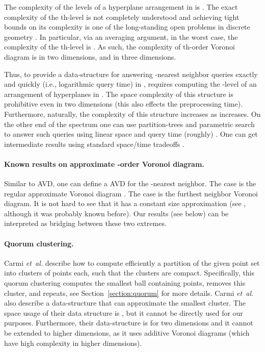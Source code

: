 \documentclass[12pt]{article}
\makeatletter
\newcommand{\Term}[1]{\textsf{#1}}
\newcommand{\TermI}[1]{\Term{#1}\index{#1@\Term{#1}}}
\theoremstyle{remark}{\theorembodyfont{\rm} \newtheorem{remark}[theorem]{Remark}}
\newcommand{\secref}[1]{Section~\ref{section:#1}}
\newcommand{\AVD}{\TermI{AVD}\xspace}
\newcommand{\etal}{\textit{et~al.}\xspace}
\renewcommand{\th}{th\xspace}
\makeatother
\begin{document}
The complexity of the  levels of a hyperplane arrangement in
 is  \cite{cs-arscg-89}. The exact complexity of the \th-level is not
completely understood and achieving tight bounds on its complexity is
one of the long-standing open problems in discrete geometry
\cite{m-ldg-02}. In particular, via an averaging argument, in the
worst case, the complexity of the \th-level is . As such, the
complexity of \th-order Voronoi diagram is  in two
dimensions, and  in three dimensions.

Thus, to provide a data-structure for answering -nearest neighbor
queries exactly and quickly (i.e., logarithmic query time) in ,
requires computing the -level of an arrangement of hyperplanes in
. The space complexity of this structure is prohibitive
even in two dimensions (this also effects the preprocessing time).
Furthermore, naturally, the complexity of this structure increases as
 increases.  On the other end of the spectrum one can use
partition-trees and parametric search to answer such queries using
linear space and query time (roughly) 
\cite{m-ept-92, c-opt-10}. One can get intermediate results using
standard space/time tradeoffs \cite{ae-rsir-98}.

\paragraph{Known results on approximate -order Voronoi diagram.}
Similar to \AVD, one can define a \AVD for the -nearest neighbor.
The case  is the regular approximate Voronoi diagram
\cite{h-rvdnl-01, am-lsavd-02, amm-sttan-09}. The case  is the
furthest neighbor Voronoi diagram. It is not hard to see that it has a
constant size approximation (see \cite{h-caspm-99}, although it was
probably known before). Our results (see below) can be interpreted as
bridging between these two extremes.

\paragraph{Quorum clustering.}
Carmi \etal \cite{cdhks-gqsa-05} describe how to compute efficiently a
partition of the given point set  into clusters of  points each,
such that the clusters are compact. Specifically, this quorum clustering
computes the smallest ball containing  points, removes
this cluster, and repeats, see \secref{quorum} for more details. Carmi
\etal \cite{cdhks-gqsa-05} also describe a data-structure that can
approximate the smallest cluster. The space usage of their data structure is
, but it cannot be directly used for our
purposes. Furthermore, their data-structure is for two dimensions and
it cannot be extended to higher dimensions, as it uses additive
Voronoi diagrams (which have high complexity in higher dimensions).
\end{document}
